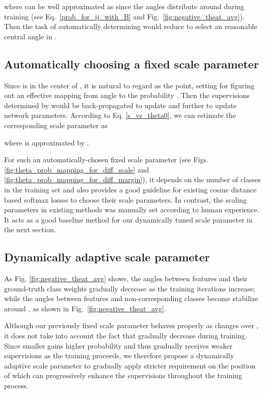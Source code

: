 \documentclass[10pt,twocolumn,letterpaper]{article}
\begin{document}
where  can be well approximated as  since the angles  distribute around  during training (see Eq.~\eqref{prob_for_ij_with_B} and Fig.~\ref{fig:negative_theat_avg}). Then the task of automatically determining  would reduce to select an reasonable central angle  in .


\subsection{Automatically choosing a fixed scale parameter}
Since  is in the center of , it is natural to regard  as the point, \ie setting  for figuring out an effective mapping from angle  to the probability .
Then the supervisions determined by  would be back-propagated to update  and further to update network parameters. 
According to Eq. \eqref{s_vs_theta0}, we can estimate the corresponding scale parameter  as

where  is approximated by .

For such an automatically-chosen fixed scale parameter  (see Figs. \ref{fig:theta_prob_mapping_for_diff_scale} and \ref{fig:theta_prob_mapping_for_diff_margin}), it depends on the number of classes  in the training set and also provides a good guideline for existing cosine distance based softmax losses to choose their scale parameters. In contrast, the scaling parameters in existing methods was manually set according to human experience. It acts as a good baseline method for our dynamically tuned scale parameter  in the next section.


\subsection{Dynamically adaptive scale parameter}
As Fig. \ref{fig:negative_theat_avg} shows, the angles  between features  and their ground-truth class weights  gradually decrease as the training iterations increase; while the angles between features  and non-corresponding classes  become stabilize around , as shown in Fig.~\ref{fig:negative_theat_avg}.

Although our previously fixed scale parameter  behaves properly as  changes over , it does not take into account the fact that  gradually decrease during training. Since smaller  gains higher probability  and thus gradually receives weaker supervisions as the training proceeds, we therefore propose a dynamically adaptive scale parameter  to gradually apply stricter requirement on the position of  which can progressively enhance the supervisions throughout the training process.
\end{document}
